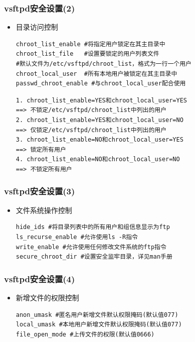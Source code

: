 \documentclass[xcolor=svgnames,presentation]{beamer}
\begin{document}
\begin{frame}[fragile]
\frametitle{vsftpd安全设置(2)}
\label{sec-3-10}
\begin{itemize}

\item 目录访问控制\\
\label{sec-3-10-1}%
\begin{verbatim}
chroot_list_enable #将指定用户锁定在其主目录中
chroot_list_file   #设置要锁定的用户列表文件
#默认文件为/etc/vsftpd/chroot_list，格式为一行一个用户
chroot_local_user  #所有本地用户被锁定在其主目录中
passwd_chroot_enable #与chroot_local_user配合使用
\end{verbatim}

\begin{verbatim}
1. chroot_list_enable=YES和chroot_local_user=YES
==> 不锁定/etc/vsftpd/chroot_list中列出的用户
2. chroot_list_enable=YES和chroot_local_user=NO
==> 仅锁定/etc/vsftpd/chroot_list中列出的用户
3. chroot_list_enable=NO和chroot_local_user=YES
==> 锁定所有用户
4. chroot_list_enable=NO和chroot_local_user=NO
==> 不锁定所有用户
\end{verbatim}
\end{itemize} %
\end{frame}
\begin{frame}[fragile]
\frametitle{vsftpd安全设置(3)}
\label{sec-3-11}
\begin{itemize}

\item 文件系统操作控制\\
\label{sec-3-11-1}%
\begin{verbatim}
hide_ids #将目录列表中的所有用户和组信息显示为ftp
ls_recurse_enable #允许使用ls -R指令
write_enable #允许使用任何修改文件系统的ftp指令
secure_chroot_dir #设置安全监牢目录，详见man手册
\end{verbatim}
\end{itemize} %
\end{frame}
\begin{frame}[fragile]
\frametitle{vsftpd安全设置(4)}
\label{sec-3-12}
\begin{itemize}

\item 新增文件的权限控制\\
\label{sec-3-12-1}%
\begin{verbatim}
anon_umask #匿名用户新增文件默认权限掩码(默认值077)
local_umask #本地用户新增文件默认权限掩码(默认值077)
file_open_mode #上传文件的权限(默认值0666)
\end{verbatim}
\end{itemize} %
\end{frame}
\end{document}
